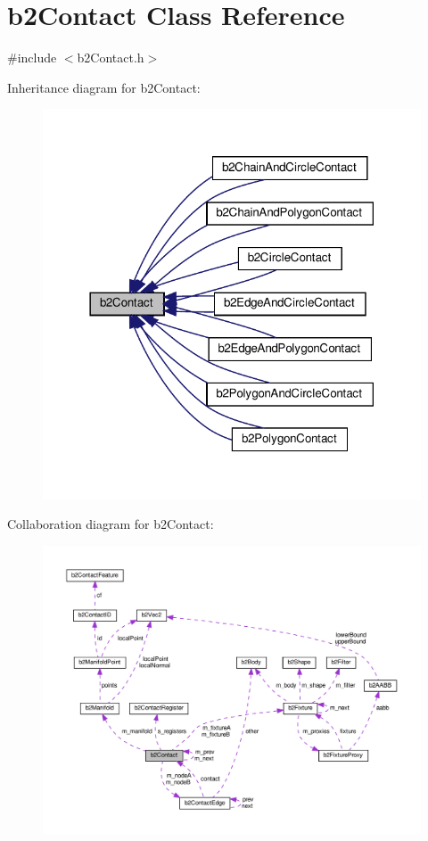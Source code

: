 \hypertarget{classb2Contact}{}\section{b2\+Contact Class Reference}
\label{classb2Contact}


{\ttfamily \#include $<$b2\+Contact.\+h$>$}



Inheritance diagram for b2\+Contact\+:
\nopagebreak
\begin{figure}[H]
\begin{center}
\leavevmode
\includegraphics[width=318pt]{classb2Contact__inherit__graph}
\end{center}
\end{figure}


Collaboration diagram for b2\+Contact\+:
\nopagebreak
\begin{figure}[H]
\begin{center}
\leavevmode
\includegraphics[width=350pt]{classb2Contact__coll__graph}
\end{center}
\end{figure}
